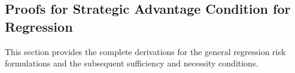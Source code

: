     
    
    
    


\subsection{Proofs for Strategic Advantage Condition for Regression}
\label{app:regression}

This section provides the complete derivations for the general regression risk formulations and the subsequent sufficiency and necessity conditions.

